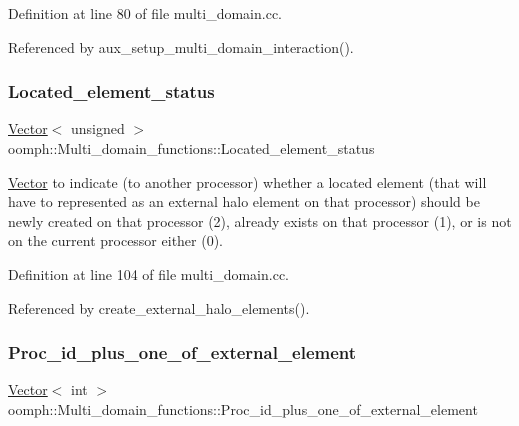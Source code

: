 Definition at line 80 of file multi\+\_\+domain.\+cc.



Referenced by aux\+\_\+setup\+\_\+multi\+\_\+domain\+\_\+interaction().

\mbox{\label{namespaceoomph_1_1Multi__domain__functions_ae6f22430d0d0df252be95eeda5c03151}} 
\subsubsection{\texorpdfstring{Located\+\_\+element\+\_\+status}{Located\_element\_status}}
{\footnotesize\ttfamily \hyperlink{classoomph_1_1Vector}{Vector}$<$ unsigned $>$ oomph\+::\+Multi\+\_\+domain\+\_\+functions\+::\+Located\+\_\+element\+\_\+status}



\hyperlink{classoomph_1_1Vector}{Vector} to indicate (to another processor) whether a located element (that will have to represented as an external halo element on that processor) should be newly created on that processor (2), already exists on that processor (1), or is not on the current processor either (0). 



Definition at line 104 of file multi\+\_\+domain.\+cc.



Referenced by create\+\_\+external\+\_\+halo\+\_\+elements().

\mbox{\label{namespaceoomph_1_1Multi__domain__functions_a05cf6413be5c69ff7535ebf0b8a153e3}} 
\subsubsection{\texorpdfstring{Proc\+\_\+id\+\_\+plus\+\_\+one\+\_\+of\+\_\+external\+\_\+element}{Proc\_id\_plus\_one\_of\_external\_element}}
{\footnotesize\ttfamily \hyperlink{classoomph_1_1Vector}{Vector}$<$ int $>$ oomph\+::\+Multi\+\_\+domain\+\_\+functions\+::\+Proc\+\_\+id\+\_\+plus\+\_\+one\+\_\+of\+\_\+external\+\_\+element}



